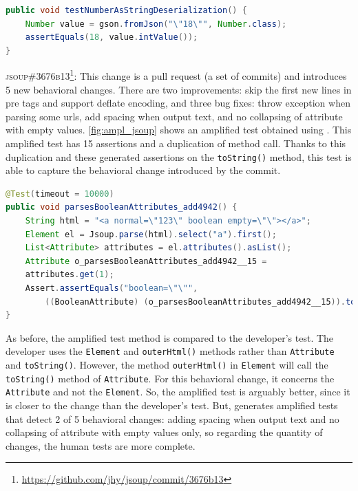 \begin{lstlisting}[language=java,caption=Provided test by the developer for \textsc{44cad04} of Gson.,label=fig:diff_gson]
public void testNumberAsStringDeserialization() {
	Number value = gson.fromJson("\"18\"", Number.class);
	assertEquals(18, value.intValue());
}
\end{lstlisting}

\textsc{jsoup\#3676b13}\footnote{\url{https://github.com/jhy/jsoup/commit/3676b13}}: This change is a pull request (\ie a set of commits) and introduces 5 new behavioral changes.
There are two improvements: skip the first new lines in pre tags and support deflate encoding, and three bug fixes: throw exception when parsing some urls, add spacing when output text, and no collapsing of attribute with empty values.
\autoref{fig:ampl_jsoup} shows an amplified test obtained using \DCII.
This amplified test has 15 assertions and a duplication of method call.
Thanks to this duplication and these generated assertions on the \texttt{toString()} method, this test is able to capture the behavioral change introduced by the commit.

\begin{lstlisting}[language=java,caption=Test generated by \DCII that detects the behavioral change of \textsc{3676b13} of Jsoup.,label=fig:ampl_jsoup]
@Test(timeout = 10000)
public void parsesBooleanAttributes_add4942() {
	String html = "<a normal=\"123\" boolean empty=\"\"></a>";
	Element el = Jsoup.parse(html).select("a").first();
	List<Attribute> attributes = el.attributes().asList();
	Attribute o_parsesBooleanAttributes_add4942__15 = 
	attributes.get(1);
	Assert.assertEquals("boolean=\"\"", 
		((BooleanAttribute) (o_parsesBooleanAttributes_add4942__15)).toString());
}
\end{lstlisting}

As before, the amplified test method is compared to the developer's test. 
The developer uses the \texttt{Element} and \texttt{outerHtml()} methods rather than \texttt{Attribute} and \texttt{toString()}.
However, the method \texttt{outerHtml()} in \texttt{Element} will call the \texttt{toString()} method of \texttt{Attribute}.
For this behavioral change, it concerns the \texttt{Attribute} and not the \texttt{Element}.
So, the amplified test is arguably better, since it is closer to the change than the developer's test.
But, \DCII generates amplified tests that detect 2 of 5 behavioral changes: adding spacing when output text and no collapsing of attribute with empty values only, so regarding the quantity of changes, the human tests are more complete.

